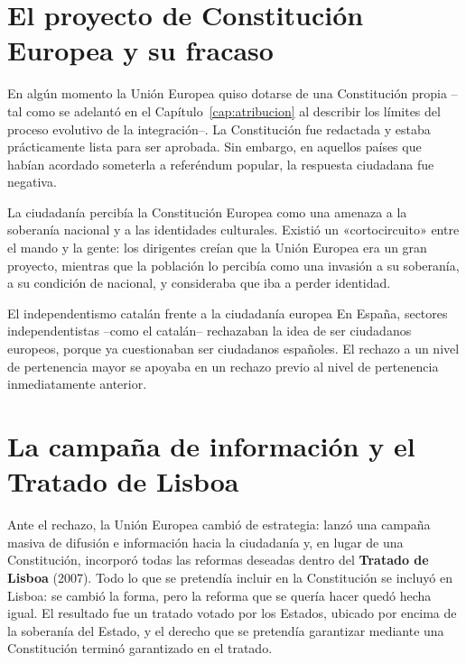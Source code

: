 \documentclass[12pt,oneside]{book}
\begin{document}
\section{El proyecto de Constitución Europea y su fracaso}

En algún momento la Unión Europea quiso dotarse de una Constitución propia --tal como se adelantó en el Capítulo~\ref{cap:atribucion} al describir los límites del proceso evolutivo de la integración--. La Constitución fue redactada y estaba prácticamente lista para ser aprobada. Sin embargo, en aquellos países que habían acordado someterla a referéndum popular, la respuesta ciudadana fue negativa.

\begin{importante}
La ciudadanía percibía la Constitución Europea como una amenaza a la soberanía nacional y a las identidades culturales. Existió un «cortocircuito» entre el mando y la gente: los dirigentes creían que la Unión Europea era un gran proyecto, mientras que la población lo percibía como una invasión a su soberanía, a su condición de nacional, y consideraba que iba a perder identidad.
\end{importante}

\begin{ejemplo}{El independentismo catalán frente a la ciudadanía europea}
En España, sectores independentistas --como el catalán-- rechazaban la idea de ser ciudadanos europeos, porque ya cuestionaban ser ciudadanos españoles. El rechazo a un nivel de pertenencia mayor se apoyaba en un rechazo previo al nivel de pertenencia inmediatamente anterior.
\end{ejemplo}

\section{La campaña de información y el Tratado de Lisboa}

Ante el rechazo, la Unión Europea cambió de estrategia: lanzó una campaña masiva de difusión e información hacia la ciudadanía y, en lugar de una Constitución, incorporó todas las reformas deseadas dentro del \textbf{Tratado de Lisboa} (2007). Todo lo que se pretendía incluir en la Constitución se incluyó en Lisboa: se cambió la forma, pero la reforma que se quería hacer quedó hecha igual. El resultado fue un tratado votado por los Estados, ubicado por encima de la soberanía del Estado, y el derecho que se pretendía garantizar mediante una Constitución terminó garantizado en el tratado.
\end{document}

